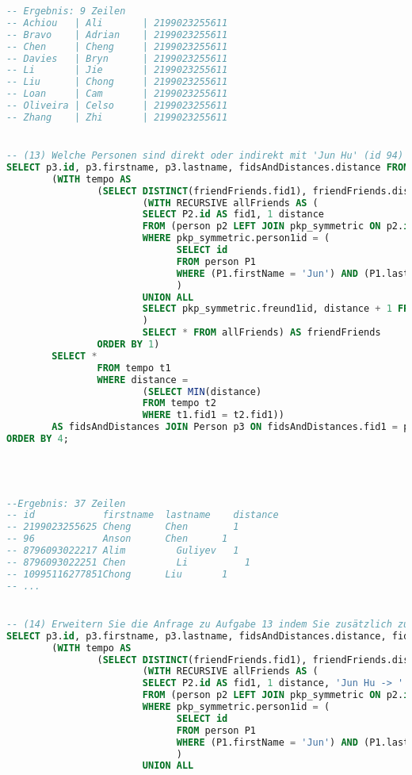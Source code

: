 \begin{lstlisting}[language=sql]
-- Ergebnis: 9 Zeilen
-- Achiou   | Ali       | 2199023255611
-- Bravo    | Adrian    | 2199023255611
-- Chen     | Cheng     | 2199023255611
-- Davies   | Bryn      | 2199023255611
-- Li       | Jie       | 2199023255611
-- Liu      | Chong     | 2199023255611
-- Loan     | Cam       | 2199023255611
-- Oliveira | Celso     | 2199023255611
-- Zhang    | Zhi       | 2199023255611


-- (13) Welche Personen sind direkt oder indirekt mit 'Jun Hu' (id 94) verbunden (befreundet)? Geben Sie für jede Person die Distanz zu Jun an.
SELECT p3.id, p3.firstname, p3.lastname, fidsAndDistances.distance FROM
        (WITH tempo AS
                (SELECT DISTINCT(friendFriends.fid1), friendFriends.distance FROM
                        (WITH RECURSIVE allFriends AS (
                        SELECT P2.id AS fid1, 1 distance
                        FROM (person p2 LEFT JOIN pkp_symmetric ON p2.id = pkp_symmetric.freund1id)
                        WHERE pkp_symmetric.person1id = (
                              SELECT id
                              FROM person P1
                              WHERE (P1.firstName = 'Jun') AND (P1.lastName = 'Hu')
                              )
                        UNION ALL
                        SELECT pkp_symmetric.freund1id, distance + 1 FROM allFriends JOIN pkp_symmetric ON allFriends.fid1=pkp_symmetric.person1id
                        )
                        SELECT * FROM allFriends) AS friendFriends
                ORDER BY 1)
        SELECT *
                FROM tempo t1
                WHERE distance =
                        (SELECT MIN(distance)
                        FROM tempo t2
                        WHERE t1.fid1 = t2.fid1))
        AS fidsAndDistances JOIN Person p3 ON fidsAndDistances.fid1 = p3.id
ORDER BY 4;




--Ergebnis: 37 Zeilen
-- id 	         firstname 	lastname 	distance
-- 2199023255625 Cheng      Chen	    1
-- 96            Anson	    Chen      1
-- 8796093022217 Alim	      Guliyev   1
-- 8796093022251 Chen	      Li	      1
-- 10995116277851Chong	    Liu       1
-- ...


-- (14) Erweitern Sie die Anfrage zu Aufgabe 13 indem Sie zusätzlich zur Distanz den Pfad zwischen den Nutzern ausgeben.
SELECT p3.id, p3.firstname, p3.lastname, fidsAndDistances.distance, fidsAndDistances.friendPath FROM
        (WITH tempo AS
                (SELECT DISTINCT(friendFriends.fid1), friendFriends.distance, friendFriends.friendPath FROM
                        (WITH RECURSIVE allFriends AS (
                        SELECT P2.id AS fid1, 1 distance, 'Jun Hu -> ' || p2.firstName || ' ' || p2.lastName  friendPath
                        FROM (person p2 LEFT JOIN pkp_symmetric ON p2.id = pkp_symmetric.freund1id)
                        WHERE pkp_symmetric.person1id = (
                              SELECT id
                              FROM person P1
                              WHERE (P1.firstName = 'Jun') AND (P1.lastName = 'Hu')
                              )
                        UNION ALL


\end{lstlisting}
